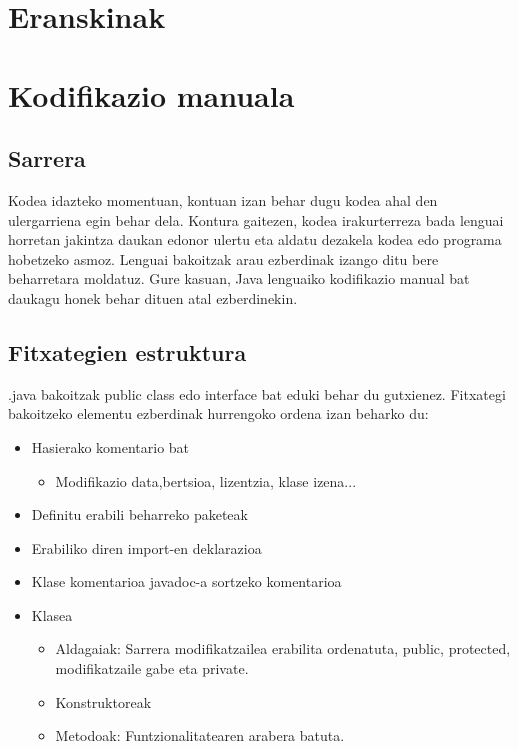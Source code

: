 \section*{Eranskinak}

\section{Kodifikazio manuala}
\label{sec:kodman}

\subsection{Sarrera}
Kodea idazteko momentuan, kontuan izan behar dugu kodea ahal den ulergarriena egin behar dela. Kontura gaitezen, kodea irakurterreza bada lenguai horretan jakintza daukan edonor ulertu eta aldatu dezakela kodea edo programa hobetzeko asmoz. Lenguai bakoitzak arau ezberdinak izango ditu bere beharretara moldatuz. Gure kasuan, Java lenguaiko kodifikazio manual bat daukagu honek behar dituen atal ezberdinekin.  

\subsection{Fitxategien estruktura}

.java bakoitzak public class edo interface bat eduki behar du gutxienez.
Fitxategi bakoitzeko elementu ezberdinak hurrengoko ordena izan beharko du:
 \begin{itemize}
    \item Hasierako komentario bat 
    \begin{itemize}
	\item Modifikazio data,bertsioa, lizentzia, klase izena...
    \end{itemize}
    \item Definitu erabili beharreko paketeak
    \item Erabiliko diren import-en deklarazioa
    \item Klase komentarioa javadoc-a sortzeko komentarioa
    \item Klasea
    \begin{itemize}
	\item Aldagaiak: Sarrera modifikatzailea erabilita ordenatuta, public, protected, modifikatzaile gabe eta private.
	\item Konstruktoreak
	\item Metodoak: Funtzionalitatearen arabera batuta.
    \end{itemize}
 \end{itemize}



